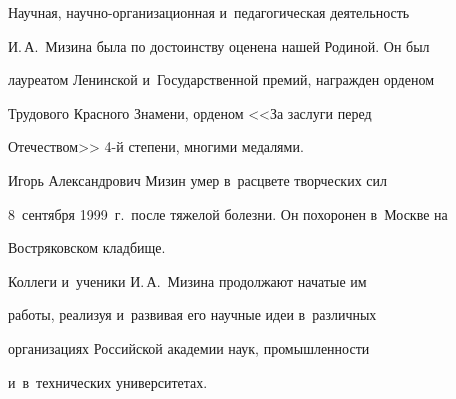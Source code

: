      Научная, научно-организационная и~педагогическая деятельность


И.\,А.~Мизина была по достоинству оценена нашей Родиной. Он был


лауреатом Ленинской и~Государственной премий, награжден орденом


Трудового Красного Знамени, орденом <<За заслуги перед


Отечеством>> 4-й степени, многими медалями.





     Игорь Александрович Мизин умер в~расцвете творческих сил


8~сентября 1999~г.\ после тяжелой болезни. Он похоронен в~Москве на


Востряковском кладбище.





     Коллеги и~ученики И.\,А.~Мизина продолжают начатые им


работы, реализуя и~развивая его научные идеи в~различных


организациях Российской академии наук, промышленности


и~в~технических университетах.





